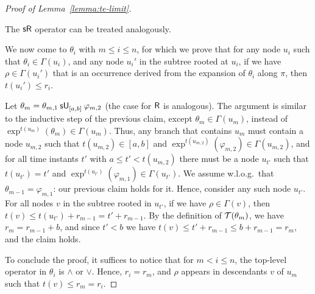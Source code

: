 \documentclass{easychair}
\begin{document}
\begin{proof}[Proof of Lemma~\ref{lemma:te-limit}]
\begin{itemize}
              The $\sreleaseop$ operator can be treated analogously.
    \end{itemize}

    We now come to $\theta_i$ with $m \leq i \leq n$, for which we prove that for any node $u_i$ such that $\theta_i \in \Gamma(u_i)$,
    and any node $u_i'$ in the subtree rooted at $u_i$, if we have $\rho \in \Gamma(u_i')$ that is an occurrence derived from the expansion of $\theta_i$ along $\pi$,
    then $t(u_i') \leq r_i$.

    Let $\theta_m = \suntil{[a,b]}{\theta_{m,1}}{\varphi_{m,2}}$ (the case for $\releaseop$ is analogous).
    The argument is similar to the inductive step of the previous claim, except $\theta_m \in \Gamma(u_m)$, instead of $\exp^{t(u_m)}(\theta_m) \in \Gamma(u_m)$.
    Thus, any branch that contains $u_m$ must contain a node $u_{m,2}$ such that $t(u_{m,2}) \in [a, b]$ and $\exp^{t(u_{m,2})}(\varphi_{m,2}) \in \Gamma(u_{m,2})$,
    and for all time instants $t'$ with $a \leq t' < t(u_{m,2})$ there must be a node $u_{t'}$ such that $t(u_{t'}) = t'$ and $\exp^{t(u_{t'})}(\varphi_{m,1}) \in \Gamma(u_{t'})$.
    We assume w.l.o.g.\ that $\theta_{m-1} = \varphi_{m,1}$: our previous claim holds for it.
    Hence, consider any such node $u_{t'}$.
    For all nodes $v$ in the subtree rooted in $u_{t'}$, if we have $\rho \in \Gamma(v)$, then $t(v) \leq t(u_{t'}) + r_{m-1} = t' + r_{m-1}$.
    By the definition of $\tinv(\theta_m)$, we have $r_m = r_{m-1} + b$, and since $t' < b$ we have $t(v) \leq t' + r_{m-1} \leq b + r_{m-1} = r_m$, and the claim holds.

    To conclude the proof, it suffices to notice that for $m < i \leq n$, the top-level operator in $\theta_i$ is $\land$ or $\lor$.
    Hence, $r_i = r_m$, and $\rho$ appears in descendants $v$ of $u_m$ such that $t(v) \leq r_m = r_i$.
\end{proof}
\end{document}
